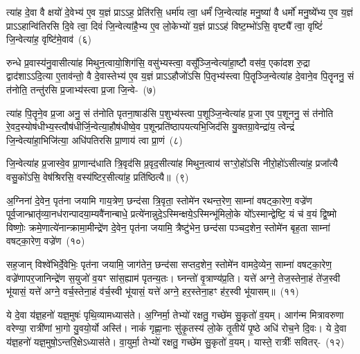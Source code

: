 त्या॑ह दे॒वा वै क्षयो॑ दे॒वेभ्य॑ ए॒व य॒ज्ञं प्रा\-ऽऽ\-ह॒ प्रेति॑रसि॒ धर्मा॑य त्वा॒ धर्मं॑ जि॒न्वेत्या॑ह मनु॒ष्या॑ वै धर्मो॑ मनु॒ष्ये᳚भ्य ए॒व य॒ज्ञं प्रा\-ऽऽ\-हान्वि॑तिरसि दि॒वे त्वा॒ दिवं॑ जि॒न्वेत्या॑है॒भ्य ए॒व लो॒केभ्यो॑ य॒ज्ञं प्रा\-ऽऽ\-ह॑ विष्ट॒म्भो॑\-ऽसि॒ वृष्ट्यै᳚ त्वा॒ वृष्टिं॑ जि॒न्वेत्या॑ह॒ वृष्टि॑मे॒वाव॑~(६)\ip

रुन्धे प्र॒वास्य॑नु॒वासीत्या॑ह मिथुन॒त्वायो॒शिग॑सि॒ वसु॑भ्यस्त्वा॒ वसू᳚ञ्जि॒न्वेत्या॑हा॒ष्टौ वस॑व॒ एका॑\-दश रु॒द्रा द्वाद॑शा\-ऽऽ\-दि॒त्या ए॒ताव॑न्तो॒ वै दे॒वास्तेभ्य॑ ए॒व य॒ज्ञं प्रा\-ऽऽ\-हौजो॑\-ऽसि पि॒तृभ्य॑स्त्वा पि॒तॄञ्जि॒न्वेत्या॑ह दे॒वाने॒व पि॒तॄननु॒ सं त॑नोति॒ तन्तु॑रसि प्र॒जाभ्य॑स्त्वा प्र॒जा \mbox{जि॒न्वे-~(७)\ip}

त्या॑ह पि॒तॄने॒व प्र॒जा अनु॒ सं त॑नोति पृतना॒षाड॑सि प॒शुभ्य॑स्त्वा प॒शूञ्जि॒न्वेत्या॑ह प्र॒जा ए॒व प॒शूननु॒ सं त॑नोति रे॒वद॒स्योष॑धीभ्य॒स्त्वौष॑धीर्जि॒न्वेत्या॒\-हौष॑धीष्वे॒व प॒शून्प्रति॑\-ष्ठापयत्यभि॒\-जिद॑सि यु॒क्तग्रा॒वेन्द्रा॑य॒ त्वेन्द्रं॑ जि॒न्वेत्या॑हा॒भिजि॑त्या॒ अधि॑\-पतिरसि प्रा॒णाय॑ त्वा प्रा॒णं~(८)\ip

जि॒न्वेत्या॑ह प्र॒जास्वे॒व प्रा॒णान्द॑धाति त्रि॒वृद॑सि प्र॒वृद॒सीत्या॑ह मिथुन॒त्वाय॑ सꣳरो॒हो॑\-ऽसि नीरो॒हो॑\-ऽसीत्या॑ह॒ प्रजा᳚त्यै वसु॒को॑\-ऽसि॒ वेष॑श्रिरसि॒ वस्य॑ष्टिर॒सीत्या॑ह॒ प्रति॑ष्ठित्यै॥~(९)\ip

{\anuvakamend[{जि॒न्वेत्यव॑ प्र॒जा जि॑न्व प्रा॒णन्त्रि॒ꣳ॒शच्च॑}]}

अ॒ग्निना॑ दे॒वेन॒ पृत॑ना जयामि गाय॒त्रेण॒ छन्द॑सा त्रि॒वृता॒ स्तोमे॑न रथन्त॒रेण॒ साम्ना॑ वषट्का॒रेण॒ वज्रे॑ण पूर्व॒जान्भ्रातृ॑व्या॒नध॑रान्पादया॒म्यवै॑\-नान्बाधे॒ प्रत्ये॑नान्नुदे॒\-ऽस्मिन्क्षये॒\-ऽस्मिन्भू॑मिलो॒के यो᳚\-ऽस्मान्द्वेष्टि॒ यं च॑ व॒यं द्वि॒ष्मो विष्णोः॒ क्रमे॒णात्ये॑नान्क्रामा॒मीन्द्रे॑ण दे॒वेन॒ पृत॑ना जयामि॒ त्रैष्टु॑भेन॒ छन्द॑सा पञ्चद॒शेन॒ स्तोमे॑न बृह॒ता साम्ना॑ वषट्का॒रेण॒ वज्रे॑ण~(१०)\ip

सह॒जान् विश्वे॑भिर्दे॒वेभिः॒ पृत॑ना जयामि॒ जाग॑तेन॒ छन्द॑सा सप्तद॒शेन॒ स्तोमे॑न वामदे॒व्येन॒ साम्ना॑ वषट्का॒रेण॒ वज्रे॑णापर॒जानिन्द्रे॑ण स॒युजो॑ व॒यꣳ सा॑स॒ह्याम॑ पृतन्य॒तः। घ्नन्तो॑ वृ॒त्राण्य॑प्र॒ति। यत्ते॑ अग्ने॒ तेज॒स्तेना॒हं ते॑ज॒स्वी भू॑यासं॒ यत्ते॑ अग्ने॒ वर्च॒स्तेना॒हं व॑र्च॒स्वी भू॑यासं॒ यत्ते॑ अग्ने॒ हर॒स्तेना॒हꣳ ह॑र॒स्वी भू॑यासम्॥~(११)\ip

{}

ये दे॒वा य॑ज्ञ॒हनो॑ यज्ञ॒मुषः॑ पृथि॒व्यामध्यास॑ते। अ॒ग्निर्मा॒ तेभ्यो॑ रक्षतु॒ गच्छे॑म सु॒कृतो॑ व॒यम्। आग॑न्म मित्रावरुणा वरेण्या॒ रात्री॑णां भा॒गो यु॒वयो॒र्यो अस्ति॑। नाकं॑ गृह्णा॒नाः सु॑कृ॒तस्य॑ लो॒के तृ॒तीये॑ पृ॒ष्ठे अधि॑ रोच॒ने दि॒वः। ये दे॒वा य॑ज्ञ॒हनो॑ यज्ञ॒मुषो॒\-ऽन्तरि॒क्षे\-ऽध्यास॑ते। वा॒युर्मा॒ तेभ्यो॑ रक्षतु॒ गच्छे॑म सु॒कृतो॑ व॒यम्। यास्ते॒ रात्रीः᳚ \mbox{सवितर्-~(१२)\ip}

